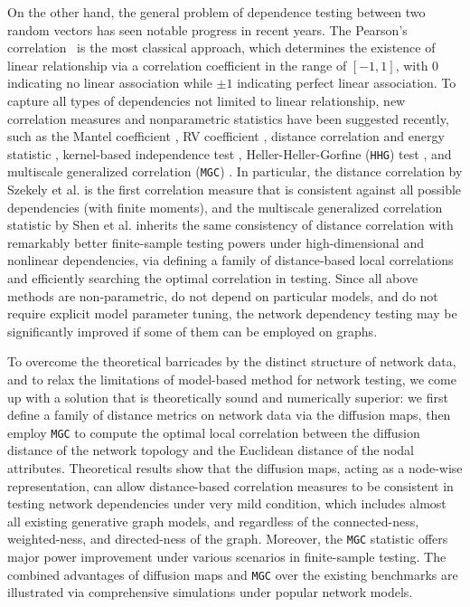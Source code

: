 \documentclass[11pt]{article}
\theoremstyle{definition}
\begin{document}
On the other hand, the general problem of dependence testing between two random vectors has seen notable progress in recent years. The Pearson's correlation~\cite{Pearson1895} is the most classical approach, which determines the existence of linear relationship via a correlation coefficient in the range of $[-1,1]$, with $0$ indicating no linear association while $\pm 1$ indicating perfect linear association. To capture all types of dependencies not limited to linear relationship, new correlation measures and nonparametric statistics have been suggested recently, such as the Mantel coefficient \cite{mantel1967}, RV coefficient \cite{RobertEscoufier1976}, distance correlation and energy statistic \cite{szekely2007measuring,szekelyRizzo2013a, RizzoSzekely2016}, kernel-based independence test \cite{GrettonGyorfi2010}, Heller-Heller-Gorfine (\texttt{HHG}) test \cite{HellerGorfine2013,heller2016consistent}, and multiscale generalized correlation (\texttt{MGC}) \cite{shen2016discovering}. In particular, the distance correlation by Szekely et al. \cite{szekely2007measuring} is the first correlation measure that is consistent against all possible dependencies (with finite moments), and the multiscale generalized correlation statistic by Shen et al. \cite{shen2016discovering} inherits the same consistency of distance correlation with remarkably better finite-sample testing powers under high-dimensional and nonlinear dependencies, via defining a family of distance-based local correlations and efficiently searching the optimal correlation in testing. Since all above methods are non-parametric, do not depend on particular models, and do not require explicit model parameter tuning, the network dependency testing may be significantly improved if some of them can be employed on graphs.

To overcome the theoretical barricades by the distinct structure of network data, and to relax the limitations of model-based method for network testing, we come up with a solution that is theoretically sound and numerically superior: we first define a family of distance metrics on network data via the diffusion maps, then employ \texttt{MGC} to compute the optimal local correlation between the diffusion distance of the network topology and the Euclidean distance of the nodal attributes. Theoretical results show that the diffusion maps, acting as a node-wise representation, can allow distance-based correlation measures to be consistent in testing network dependencies under very mild condition, which includes almost all existing generative graph models, and regardless of the connected-ness, weighted-ness, and directed-ness of the graph. Moreover, the \texttt{MGC} statistic offers major power improvement under various scenarios in finite-sample testing. The combined advantages of diffusion maps and \texttt{MGC} over the existing benchmarks are illustrated via comprehensive simulations under popular network models.
\end{document}
